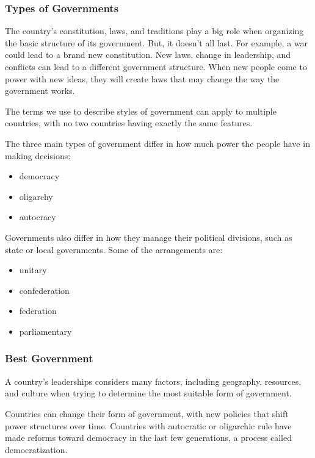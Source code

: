 
\subsubsection{Types of Governments}

The country's constitution, laws, and traditions play a big role when organizing
the basic structure of its government. But, it doesn't all last. For example, a
war could lead to a brand new constitution. New laws, change in leadership, and
conflicts can lead to a different government structure. When new people come to
power with new ideas, they will create laws that may change the way the
government works.

The terms we use to describe styles of government can apply to multiple
countries, with no two countries having exactly the same features.

The three main types of government differ in how much power the people have in
making decisions:

\begin{itemize}
  \item democracy
  \item oligarchy
  \item autocracy
\end{itemize}

Governments also differ in how they manage their political divisions, such as
state or local governments. Some of the arrangements are:

\begin{itemize}
  \item unitary
  \item confederation
  \item federation
  \item parliamentary
\end{itemize}

\subsubsection{Best Government}

A country's leaderships considers many factors, including geography, resources,
and culture when trying to determine the most suitable form of government.

Countries can change their form of government, with new policies that shift
power structures over time. Countries with autocratic or oligarchic rule have
made reforms toward democracy in the last few generations, a process called
democratization.


